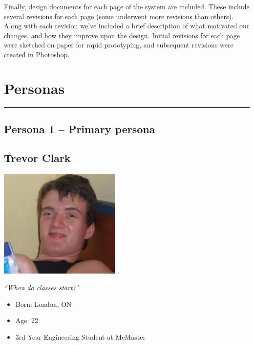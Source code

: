 \documentclass[12pt]{article}
\begin{document}
Finally, design documents for each page of the system are included. These include several revisions for each page (some underwent more revisions than others). Along with each revision we've included a brief description of what motivated our changes, and how they improve upon the design. Initial revisions for each page were sketched on paper for rapid prototyping, and subsequent revisions were created in Photoshop.


\newpage
\section{Personas}
\vspace{5mm}
\hrule
\vspace{4mm}
\subsection{Persona 1 -- Primary persona}
\vspace{11mm}

\subsection*{Trevor Clark}
\vspace{4mm}

\begin{minipage}{60mm}
\includegraphics[width=60mm]{Trevor.jpg}
\begin{center}
\emph{``When do classes start?"}
\end{center}
\end{minipage}
\begin{minipage}{\textwidth}
\begin{itemize}
\item Born: London, ON
\item Age: 22
\item 3rd Year Engineering Student at McMaster
\end{itemize}
\end{minipage}\\\\\\
\end{document}
